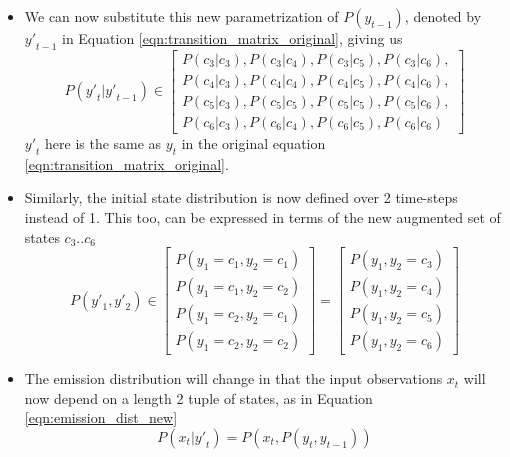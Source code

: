 \documentclass[parskip=half]{scrartcl}
\begin{document}
\begin{itemize}
            \item 
            We can now substitute this new parametrization of $P(y_{t-1})$, denoted by ${y\prime}_{t-1}$ in Equation \ref{eqn:transition_matrix_original}, giving us
            \begin{equation} \label{eqn:transition_matrix_new}
                P({y\prime}_t|{y\prime}_{t-1})
                \in 
                \begin{bmatrix}
                    P(c_3|c_3), P(c_3|c_4), P(c_3|c_5), P(c_3|c_6), \\
                    P(c_4|c_3), P(c_4|c_4), P(c_4|c_5), P(c_4|c_6), \\
                    P(c_5|c_3), P(c_5|c_5), P(c_5|c_5), P(c_5|c_6), \\
                    P(c_6|c_3), P(c_6|c_4), P(c_6|c_5), P(c_6|c_6)
                \end{bmatrix}
            \end{equation}
            ${y\prime}_t$ here is the same as $y_t$ in the original equation \ref{eqn:transition_matrix_original}.
            \item 
            Similarly, the initial state distribution is now defined over 2 time-steps instead of 1. This too, can be expressed in terms of the new augmented set of states $c_3 .. c_6$
            \begin{equation} \label{eqn:initial_state_dist_new}
                P({y\prime}_1, {y\prime}_2) \in \begin{bmatrix} P(y_1 = c_1, y_2 = c_1) \\ P(y_1 = c_1, y_2 = c_2) \\ P(y_1 = c_2, y_2 = c_1) \\ P(y_1 = c_2, y_2 = c_2) \end{bmatrix} = \begin{bmatrix} P(y_1,y_2 = c_3) \\ P(y_1,y_2 = c_4) \\ P(y_1,y_2 = c_5) \\ P(y_1,y_2 = c_6) \end{bmatrix}
            \end{equation}
            \item 
            The emission distribution will change in that the input observations $x_t$ will now depend on a length 2 tuple of states, as in Equation \ref{eqn:emission_dist_new}
            \begin{equation} \label{eqn:emission_dist_new}
                P(x_t | {y\prime}_t) = P(x_t, P(y_t, y_{t-1}))
            \end{equation}
        \end{itemize}
\end{document}
